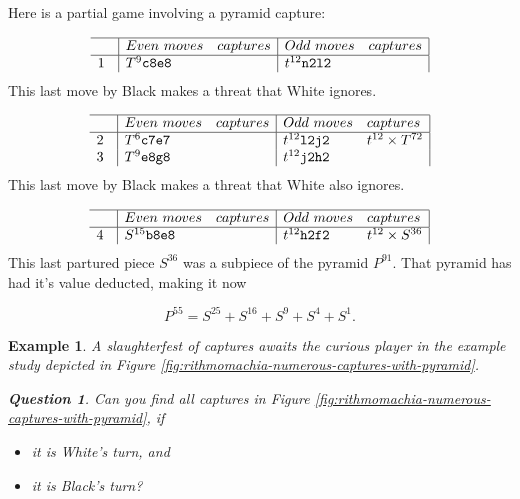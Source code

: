 \documentclass[14pt]{extarticle}
\newtheorem{example}[theorem]{Example}
\newtheorem{question}{Question}
\begin{document}

Here is a partial game involving a pyramid capture:

\[
\begin{array}{l|ll|ll|} \hline
  \quad & Even\ moves & captures & Odd\ moves & captures \\ \hline
  1 & T^9{\tt c8e8} &  & t^{12}{\tt n2l2} &   \\
\end{array}
\]
This last move by Black makes a threat that White ignores.

\[
\begin{array}{l|ll|ll|} \hline
  \quad & Even\ moves & captures & Odd\ moves & captures \\ \hline  
  2 & T^6{\tt c7e7} &  & t^{12}{\tt l2j2} & t^{12}\times T^{72}  \\
  3 & T^9{\tt e8g8} &  & t^{12}{\tt j2h2} &   \\
\end{array}
\]
This last move by Black makes a threat that White also ignores.

\[
\begin{array}{l|ll|ll|} \hline
  \quad & Even\ moves & captures & Odd\ moves & captures \\ \hline  
  4 & S^{15}{\tt b8e8} &  & t^{12}{\tt h2f2} & t^{12}\times S^{36}  \\
\end{array}
\]
This last partured piece $S^{36}$ was a subpiece of the 
pyramid $P^{91}$. That pyramid has had it's value deducted, making it now

\[
P^{55} = S^{25}+S^{16}+S^9+S^4+S^1.
\]


\begin{example}
A slaughterfest of captures awaits the curious player
in the example study depicted in
Figure \ref{fig:rithmomachia-numerous-captures-with-pyramid}.

\begin{question}
Can you find all captures in
Figure \ref{fig:rithmomachia-numerous-captures-with-pyramid}, if
\begin{itemize}
\item[(a)]
  it is White's turn, and
\item[(b)]
  it is Black's turn?
\end{itemize}
\end{question}
\end{example}
\end{document}

